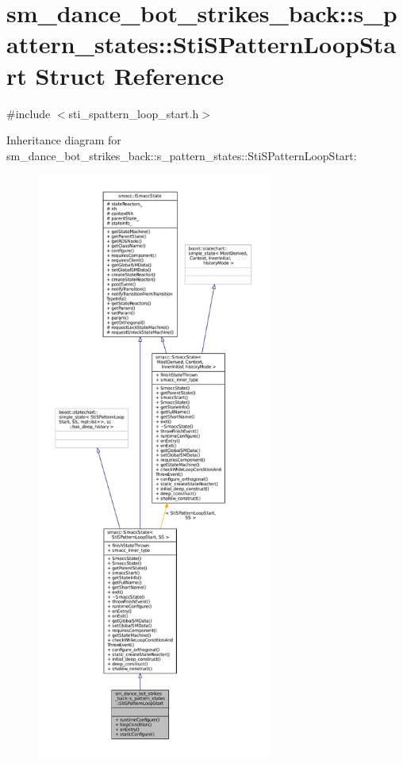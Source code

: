 \hypertarget{structsm__dance__bot__strikes__back_1_1s__pattern__states_1_1StiSPatternLoopStart}{}\section{sm\+\_\+dance\+\_\+bot\+\_\+strikes\+\_\+back\+:\+:s\+\_\+pattern\+\_\+states\+:\+:Sti\+S\+Pattern\+Loop\+Start Struct Reference}
\label{structsm__dance__bot__strikes__back_1_1s__pattern__states_1_1StiSPatternLoopStart}


{\ttfamily \#include $<$sti\+\_\+spattern\+\_\+loop\+\_\+start.\+h$>$}



Inheritance diagram for sm\+\_\+dance\+\_\+bot\+\_\+strikes\+\_\+back\+:\+:s\+\_\+pattern\+\_\+states\+:\+:Sti\+S\+Pattern\+Loop\+Start\+:
\nopagebreak
\begin{figure}[H]
\begin{center}
\leavevmode
\includegraphics[height=550pt]{structsm__dance__bot__strikes__back_1_1s__pattern__states_1_1StiSPatternLoopStart__inherit__graph}
\end{center}
\end{figure}


